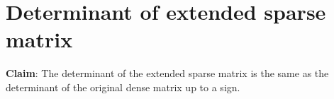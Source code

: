 \documentclass[times]{nlaauth}
\begin{document}


\section{Determinant of extended sparse matrix}


\textbf{Claim}:
The determinant of the extended sparse matrix is the same as the determinant of the original dense matrix up to a sign.
\end{document}
